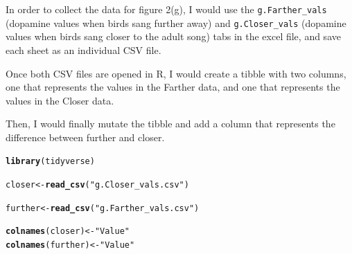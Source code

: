 \documentclass{article}\usepackage[]{graphicx}\usepackage[]{xcolor}
\makeatletter
\newcommand{\hlsng}[1]{\textcolor[rgb]{0.192,0.494,0.8}{#1}}%
\newcommand{\hldef}[1]{\textcolor[rgb]{0.345,0.345,0.345}{#1}}%
\newcommand{\hlkwb}[1]{\textcolor[rgb]{0.69,0.353,0.396}{#1}}%
\newcommand{\hlkwd}[1]{\textcolor[rgb]{0.737,0.353,0.396}{\textbf{#1}}}%
\newenvironment{kframe}{%
 \def\at@end@of@kframe{}%
 \ifinner\ifhmode%
  \def\at@end@of@kframe{\end{minipage}}%
  \begin{minipage}{\columnwidth}%
 \fi\fi%
 \def\FrameCommand##1{\hskip\@totalleftmargin \hskip-\fboxsep
 \colorbox{shadecolor}{##1}\hskip-\fboxsep
     \hskip-\linewidth \hskip-\@totalleftmargin \hskip\columnwidth}%
 \MakeFramed {\advance\hsize-\width
   \@totalleftmargin\z@ \linewidth\hsize
   \@setminipage}}%
 {\par\unskip\endMakeFramed%
 \at@end@of@kframe}
\newenvironment{knitrout}{}{} %
\makeatother
\begin{document}
\begin{enumerate}
In order to collect the data for figure 2(g), I would use the \texttt{g.Farther\_vals} (dopamine values when birds sang further away) and \texttt{g.Closer\_vals} (dopamine values when birds sang closer to the adult song) tabs in the excel file, and save each sheet as an individual CSV file. 

Once both CSV files are opened in R, I would create a tibble with two columns, one that represents the values in the Farther data, and one that represents the values in the Closer data.

Then, I would finally mutate the tibble and add a column that represents the difference between further and closer.

\begin{knitrout}
\color{fgcolor}\begin{kframe}
\begin{alltt}
\hlkwd{library}\hldef{(tidyverse)}

\hldef{closer} \hlkwb{<-} \hlkwd{read_csv}\hldef{(}\hlsng{"g.Closer_vals.csv"}\hldef{)}
\end{alltt}


{\ttfamily\noindent\itshape{}}\begin{alltt}
\hldef{further} \hlkwb{<-} \hlkwd{read_csv}\hldef{(}\hlsng{"g.Farther_vals.csv"}\hldef{)}
\end{alltt}


{\ttfamily\noindent\itshape{}}\begin{alltt}
\hlkwd{colnames}\hldef{(closer)} \hlkwb{<-} \hlsng{"Value"}
\hlkwd{colnames}\hldef{(further)} \hlkwb{<-} \hlsng{"Value"}


\end{alltt}
\end{kframe}
\end{knitrout}
\end{enumerate}
\end{document}
